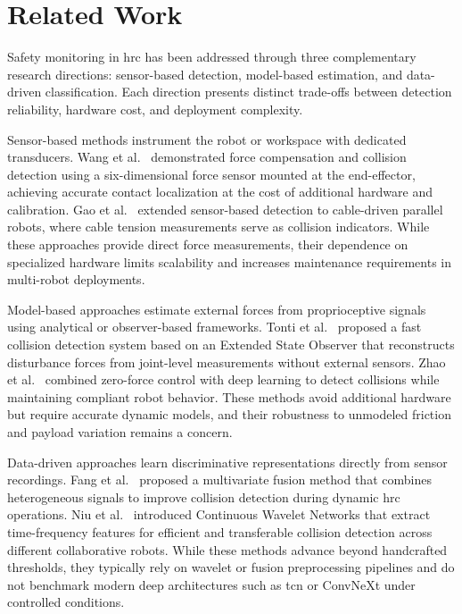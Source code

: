 \documentclass[3p,times,procedia]{elsarticle}
\begin{document}
\section{Related Work}
\label{sec:related}

Safety monitoring in \ac{hrc} has been addressed through three complementary research directions: sensor-based detection, model-based estimation, and data-driven classification. Each direction presents distinct trade-offs between detection reliability, hardware cost, and deployment complexity.

Sensor-based methods instrument the robot or workspace with dedicated transducers. Wang et al.~\cite{wang2025sixdof} demonstrated force compensation and collision detection using a six-dimensional force sensor mounted at the end-effector, achieving accurate contact localization at the cost of additional hardware and calibration. Gao et al.~\cite{gao2024cable} extended sensor-based detection to cable-driven parallel robots, where cable tension measurements serve as collision indicators. While these approaches provide direct force measurements, their dependence on specialized hardware limits scalability and increases maintenance requirements in multi-robot deployments.

Model-based approaches estimate external forces from proprioceptive signals using analytical or observer-based frameworks. Tonti et al.~\cite{tonti2024eso} proposed a fast collision detection system based on an Extended State Observer that reconstructs disturbance forces from joint-level measurements without external sensors. Zhao et al.~\cite{zhao2025zeroforce} combined zero-force control with deep learning to detect collisions while maintaining compliant robot behavior. These methods avoid additional hardware but require accurate dynamic models, and their robustness to unmodeled friction and payload variation remains a concern.

Data-driven approaches learn discriminative representations directly from sensor recordings. Fang et al.~\cite{fang2024multivariate} proposed a multivariate fusion method that combines heterogeneous signals to improve collision detection during dynamic \ac{hrc} operations. Niu et al.~\cite{niu2024wavelet} introduced Continuous Wavelet Networks that extract time-frequency features for efficient and transferable collision detection across different collaborative robots. While these methods advance beyond handcrafted thresholds, they typically rely on wavelet or fusion preprocessing pipelines and do not benchmark modern deep architectures such as \ac{tcn} or ConvNeXt under controlled conditions.
\end{document}
